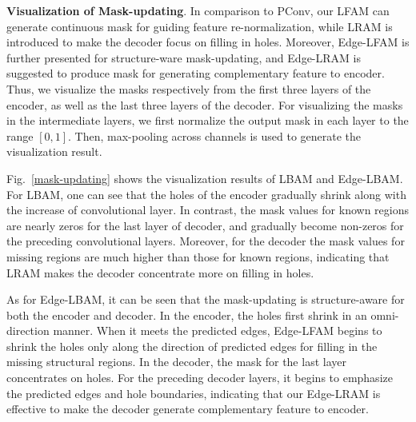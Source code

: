 \documentclass[10pt,journal,compsoc]{IEEEtran}
\begin{document}
{\textbf{Visualization of Mask-updating}.} In comparison to PConv, our LFAM can generate continuous mask for guiding feature re-normalization, while LRAM is introduced to make the decoder focus on filling in holes.
%
Moreover, Edge-LFAM is further presented for structure-ware mask-updating, and Edge-LRAM is suggested to produce mask for generating complementary feature to encoder.
%
Thus, we visualize the masks respectively from the first three layers of the encoder, as well as the last three layers of the decoder.
%
For visualizing the masks in the intermediate layers, we first normalize the output mask in each layer to the range $[0, 1]$.
%
Then, max-pooling across channels is used to generate the visualization result.


%



%


Fig.~\ref{mask-updating} shows the visualization results of LBAM and Edge-LBAM.
%
For LBAM, one can see that the holes of the encoder gradually shrink along with the increase of convolutional layer.
%
In contrast, the mask values for known regions are nearly zeros for the last layer of decoder, and gradually become non-zeros for the preceding convolutional layers.
%
Moreover, for the decoder the mask values for missing regions are much higher than those for known regions, indicating that LRAM makes the decoder concentrate more on filling in holes.


As for Edge-LBAM, it can be seen that the mask-updating is structure-aware for both the encoder and decoder.
%
In the encoder, the holes first shrink in an omni-direction manner.
%
When it meets the predicted edges, Edge-LFAM begins to shrink the holes only along the direction of predicted edges for filling in the missing structural regions.
%
In the decoder, the mask for the last layer concentrates on holes.
%
For the preceding decoder layers, it begins to emphasize the predicted edges and hole boundaries, indicating that our Edge-LRAM is effective to make the decoder generate complementary feature to encoder.
\end{document}
